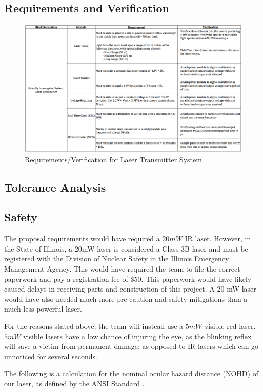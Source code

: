 \documentclass[letterpaper,10pt]{article}
\begin{document}
\begin{spacing}{1.15}
\section{Requirements and Verification}
\begin{figure} [H]
	\centering
	\includegraphics[scale=0.3]{Requirements.png}
	\caption{Requirements/Verification for Laser Transmitter System\label{fig:requirements}}
\end{figure}
\subsection{Tolerance Analysis}
\subsection{Safety} \label{section-safety-ethics}
The proposal requirements would have required a $20mW$ IR laser. However, in the State of Illinois, a 20mW laser is considered a Class 3B laser and must be registered with the Division of Nuclear Safety in the Illinois Emergency Management Agency. This would have required the team to file the correct paperwork and pay a registration fee of \$50. This paperwork would have likely caused delays in receiving parts and construction of this project. A 20 mW laser would have also needed much more pre-caution and safety mitigations than a much less powerful laser.

For the reasons stated above, the team will instead use a $5mW$ visible red laser. $5mW$ visible lasers have a low chance of injuring the eye, as the blinking reflex will save a victim from permanent damage; as opposed to IR lasers which can go unnoticed for several seconds. 

The following is a calculation for the nominal ocular hazard distance (NOHD) of our laser, as defined by the ANSI Standard \cite{ANSI}.


\end{spacing}
\end{document}
